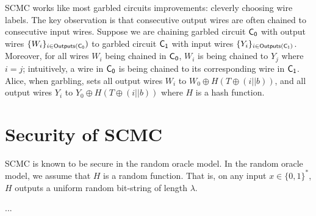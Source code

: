 SCMC works like most garbled circuits improvements: cleverly choosing wire labels.
The key observation is that consecutive output wires are often chained to consecutive input wires.
Suppose we are chaining garbled circuit $\sf {C}_0$ with output wires $\{W_i\}_{i \in {\sf {Outputs}}(\sf {C}_0})$ to garbled circuit $\sf {C}_1$ with input wires $\{Y_i\}_{i \in {\sf {Outputs}}(\sf {C}_1)}$.
Moreover, for all wires $W_i$ being chained in $\sf {C}_0$, $W_i$ is being chained to $Y_j$ where $i = j$; intuitively, a wire in $\sf {C}_0$ is being chained to its corresponding wire in $\sf {C}_1$.
Alice, when garbling, sets all output wires $W_i$ to $W_0 \oplus H(T \oplus (i || b))$, and all output wires $Y_i$ to $Y_0 \oplus H(T \oplus (i || b))$ where $H$ is a hash function.

\section{Security of SCMC}
SCMC is known to be secure in the random oracle model.
In the random oracle model, we assume that $H$ is a random function.
That is, on any input $x \in \{0,1\}^*$, $H$ outputs a uniform random bit-string of length $\lambda$.

...

